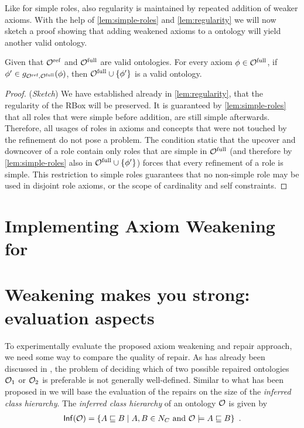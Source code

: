 \documentclass[
]{ceurart}
\begin{document}
Like for simple roles, also regularity is maintained by repeated addition of weaker axioms. With the help of \cref{lem:simple-roles} and \cref{lem:regularity} we will now sketch a proof showing that adding weakened axioms to a \SROIQ ontology will yield another valid \SROIQ ontology.

\begin{lemma} \label{lem:global-constraints}
  Given that ${\mathcal{O}^\textnormal{ref}}$ and ${\mathcal{O}^\textnormal{full}}$ are valid \SROIQ ontologies. For every axiom $\phi \in {\mathcal{O}^\textnormal{full}}$, if $\phi' \in g_{{\mathcal{O}^\textnormal{ref}},{\mathcal{O}^\textnormal{full}}}(\phi)$, then ${\mathcal{O}^\textnormal{full}} \cup \{ \phi' \}$ is a valid \SROIQ ontology.
\end{lemma}

\begin{proof}(\emph{Sketch})
  We have established already in \cref{lem:regularity}, that the regularity of the RBox will be preserved.
  It is guaranteed by \cref{lem:simple-roles} that all roles that were simple before addition, are still simple afterwards. Therefore, all usages of roles in axioms and concepts that were not touched by the refinement do not pose a problem. The condition static that the upcover and downcover of a role contain only roles that are simple in ${\mathcal{O}^\textnormal{full}}$ (and therefore by \cref{lem:simple-roles} also in ${\mathcal{O}^\textnormal{full}} \cup \{ \phi' \}$) forces that every refinement of a role is simple. This restriction to simple roles guarantees that no non-simple role may be used in disjoint role axioms, or the scope of cardinality and self constraints.
\end{proof}

\section{Implementing Axiom Weakening for \SROIQ}


\section{Weakening makes you strong: evaluation aspects}

To experimentally evaluate the proposed axiom weakening and repair approach, we need some way to compare the quality of repair. As has already been discussed in \cite{troquard2018repairing}, the problem of deciding which of two possible repaired ontologies $\mathcal{O}_1$ or $\mathcal{O}_2$ is preferable is not generally well-defined. Similar to what has been proposed in \cite{troquard2018repairing} we will base the evaluation of the repairs on the size of the \emph{inferred class hierarchy}. The \emph{inferred class hierarchy} of an ontology $\mathcal{O}$ is given by
\begin{align*}
  {\ensuremath{\mathsf{Inf}}}(\mathcal{O}) = \{ A \sqsubseteq B \mid A, B \in N_C \text{ and } \mathcal{O} \models A \sqsubseteq B \} \enspace.
\end{align*}
\end{document}
